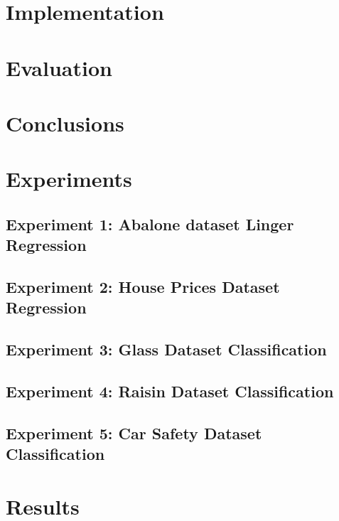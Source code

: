 \documentclass[a4paper, 12pt]{report}
\begin{document}
\chapter{Implementation}
\label{ch:Implementation}

\chapter{Evaluation}
\label{ch:Evaluation}

\chapter{Conclusions}
\label{ch:Conclusions}

\chapter{Experiments}
\label{ch:Experimnents}

\section{Experiment 1: Abalone dataset Linger Regression}

\section{Experiment 2: House Prices Dataset Regression}

\section{Experiment 3: Glass Dataset Classification}

\section{Experiment 4: Raisin Dataset Classification}

\section{Experiment 5: Car Safety Dataset Classification}

\chapter{Results}
\label{ch:Results}


\end{document}
